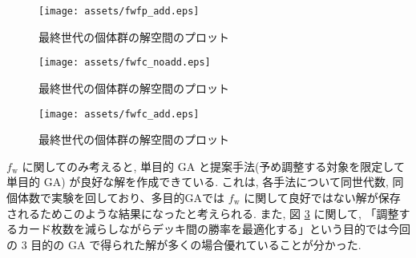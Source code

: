 \documentclass{jarticle}     %
\begin{document}
\newpage

\begin{figure}[ht]
  \centering
  \texttt{[image: assets/fwfp\_add.eps]}
  \vspace{-0.3cm}
  \caption{最終世代の個体群の解空間のプロット}
  \label{fig:fwfp_add}
\end{figure}

\newpage 

\begin{figure}[ht]
  \centering
  \texttt{[image: assets/fwfc\_noadd.eps]}
  \vspace{-0.3cm}
  \caption{最終世代の個体群の解空間のプロット}
  \label{fig:fwfc_noadd}
\end{figure}

\begin{figure}[ht]
  \centering
  \texttt{[image: assets/fwfc\_add.eps]}
  \vspace{-0.3cm}
  \caption{最終世代の個体群の解空間のプロット}
  \label{fig:fwfc_add}
\end{figure}

$f_\mathrm{w}$ に関してのみ考えると, 単目的 GA と提案手法(予め調整する対象を限定して単目的 GA) が良好な解を作成できている. 
これは, 各手法について同世代数, 同個体数で実験を回しており、多目的GAでは $f_\mathrm{w}$ に関して良好ではない解が保存されるためこのような結果になったと考えられる. 
また, 図 \ref{fig:fwfc_add} に関して, 「調整するカード枚数を減らしながらデッキ間の勝率を最適化する」という目的では今回の 3 目的の GA で得られた解が多くの場合優れていることが分かった.




\end{document}
